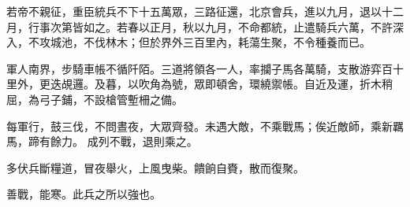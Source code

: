 \begin{pinyinscope}
 若帝不親征，重臣統兵不下十五萬眾，三路征還，北京會兵，進以九月，退以十二月，行事次第皆如之。若春以正月，秋以九月，不命都統，止遣騎兵六萬，不許深入，不攻城池，不伐林木；但於界外三百里內，耗蕩生聚，不令種養而已。



 軍人南界，步騎車帳不循阡陌。三道將領各一人，率攔子馬各萬騎，支散游弈百十里外，更迭覘邏。及暮，以吹角為號，眾即頓舍，環繞禦帳。自近及運，折木稍屈，為弓子鋪，不設槍管塹柵之備。



 每軍行，鼓三伐，不問晝夜，大眾齊發。未遇大敵，不乘戰馬；俟近敵師，乘新羈馬，蹄有餘力。
 成列不戰，退則乘之。



 多伏兵斷糧道，冒夜舉火，上風曳柴。饋餉自賚，散而復聚。



 善戰，能寒。此兵之所以強也。



\end{pinyinscope}